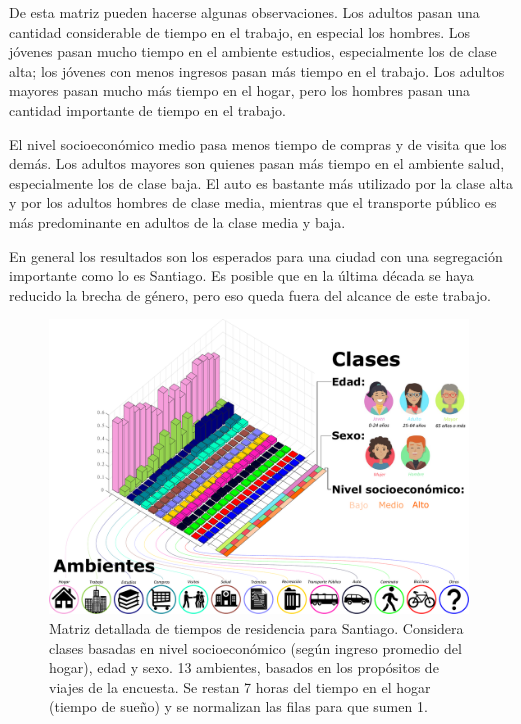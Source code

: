 De esta matriz pueden hacerse algunas observaciones. Los adultos pasan una cantidad considerable de tiempo en el trabajo, en especial los hombres. Los jóvenes pasan mucho tiempo en el ambiente estudios, especialmente los de clase alta; los jóvenes con menos ingresos pasan más tiempo en el trabajo. Los adultos mayores pasan mucho más tiempo en el hogar, pero los hombres pasan una cantidad importante de tiempo en el trabajo. 

El nivel socioeconómico medio pasa menos tiempo de compras y de visita que los demás. Los adultos mayores son quienes pasan más tiempo en el ambiente salud, especialmente los de clase baja. El auto es bastante más utilizado por la clase alta y por los adultos hombres de clase media, mientras que el transporte público es más predominante en adultos de la clase media y baja.

En general los resultados son los esperados para una ciudad con una segregación importante como lo es Santiago. Es posible que en la última década se haya reducido la brecha de género, pero eso queda fuera del alcance de este trabajo.


\begin{figure}[!h]
\centering
\includegraphics[width=0.99\textwidth]{img/resultados/matrixP/matriz Pambientesyclases.pdf}
\caption[Matriz detallada de tiempos de residencia para Santiago]{Matriz detallada de tiempos de residencia para Santiago. Considera clases basadas en nivel socioeconómico (según ingreso promedio del hogar), edad y sexo. 13 ambientes, basados en los propósitos de viajes de la encuesta. Se restan 7 horas del tiempo en el hogar (tiempo de sueño) y se normalizan las filas para que sumen 1.}
\label{img:Pmatrix-full}
\end{figure}

